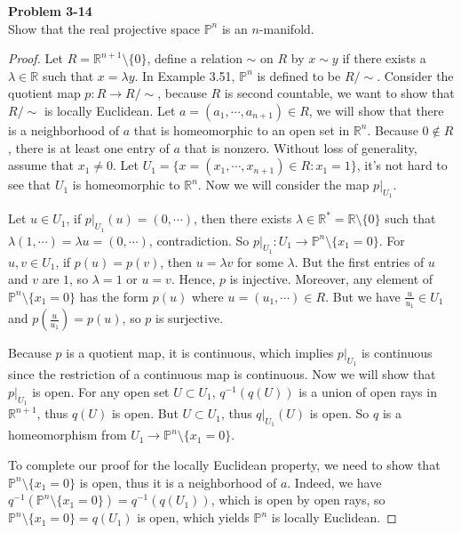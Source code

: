\documentclass[12pt, a4paper]{article}
\theoremstyle{plain}
\newcommand{\R}{\mathbb{R}}
\newenvironment{problem}[2][Problem]
    { \begin{mdframed}[backgroundcolor=gray!20] \textbf{#1 #2} \\}
    {  \end{mdframed}}
\begin{document}
\begin{problem}{3-14}
Show that the real projective space $\mathbb{P}^n$ is an $n$-manifold.
\end{problem}
	\begin{proof}
	Let $R=\R^{n+1}\setminus\{0\}$, define a relation $\sim$ on $R$ by $x\sim y$ if there exists a $\lambda\in \R$ such that $x=\lambda y$. In Example 3.51, $\mathbb{P}^n$ is defined to be $R/\sim$. Consider the quotient map $p:R\rightarrow R/\sim$, because $R$ is second countable, we want to show that $R/\sim$ is locally Euclidean. Let $a=(a_1,\cdots,a_{n+1})\in R$, we will show that there is a neighborhood of $a$ that is homeomorphic to an open set in $\R^n$. Because $0\notin R$, there is at least one entry of $a$ that is nonzero. Without loss of generality, assume that $x_1\neq 0$. Let $U_1=\{x=(x_1,\cdots,x_{n+1})\in R:x_1=1\}$, it's not hard to see that $U_1$ is homeomorphic to $\R^n$. Now we will consider the map $p|_{U_1}$.
	
	Let $u\in U_1$, if $p|_{U_1}(u)=(0,\cdots)$, then there exists $\lambda\in \R^*=\R\setminus\{0\}$ such that $\lambda (1,\cdots) =\lambda u=(0,\cdots)$, contradiction. So $p|_{U_1}:U_1\rightarrow \mathbb{P}^n\setminus \{x_1=0\}$. For $u,v\in U_1$, if $p(u)=p(v)$, then $u=\lambda v$ for some $\lambda$. But the first entries of $u$ and $v$ are $1$, so $\lambda =1$ or $u=v$. Hence, $p$ is injective. Moreover, any element of $\mathbb{P}^n\setminus \{x_1=0\}$ has the form $p(u)$ where $u=(u_1,\cdots)\in R$. But we have $\frac{u}{u_1}\in U_1$ and $p(\frac{u}{u_1})=p(u)$, so $p$ is surjective.
	
	Because $p$ is a quotient map, it is continuous, which implies $p|_{U_1}$ is continuous since the restriction of a continuous map is continuous. Now we will show that $p|_{U_1}$ is open. For any open set $U\subset U_1$, $q^{-1}(q(U))$ is a union of open rays in $\R^{n+1}$, thus $q(U)$ is open. But $U\subset U_1$, thus $q|_{U_1}(U)$ is open. So $q$ is a homeomorphism from $U_1\rightarrow \mathbb{P}^n\setminus\{x_1=0\}$.
	
	To complete our proof for the locally Euclidean property, we need to show that $\mathbb{P}^n\setminus\{x_1=0\}$ is open, thus it is a neighborhood of $a$. Indeed, we have $q^{-1}(\mathbb{P}^n\setminus\{x_1=0\})=q^{-1}(q(U_1))$, which is open by open rays, so $\mathbb{P}^n\setminus\{x_1=0\}=q(U_1)$ is open, which yields $\mathbb{P}^n$ is locally Euclidean.
	

\end{proof}
\end{document}
